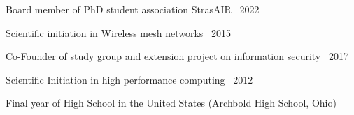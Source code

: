 

Board member of PhD student association StrasAIR \dotfill {} \textemdash\ 2022

Scientific initiation in Wireless mesh networks \dotfill {} \textemdash\ 2015

Co-Founder of study group and extension project on information security \dotfill {} \textemdash\ 2017

Scientific Initiation in high performance computing	\dotfill {} \textemdash\ 2012

Final year of High School in the United States (Archbold High School, Ohio)	\dotfill {}
